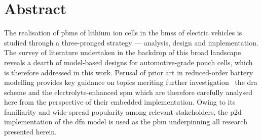 
\chapter*{Abstract\hfill}

\vspace*{-1cm}

The  realisation of  \glspl{pbm}  of lithium  ion cells  in  the \glspl{bms}  of
electric  vehicles is  studied through  a three-pronged  strategy ---  analysis,
design  and  implementation.   The  survey  of  literature   undertaken  in  the
backdrop of  this broad landscape  reveals a  dearth of model-based  designs for
automotive-grade  pouch  cells,  which  is therefore  addressed  in  this  work.
Perusal of  prior art in  reduced-order battery modelling provides  key guidance
on  topics meriting  further  investigation \viz~the  \gls{dra}  scheme and  the
electrolyte-enhanced \gls{spm} which are  therefore carefully analysed here from
the perspective of  their embedded implementation. Owing to  its familiarity and
wide-spread popularity among relevant stakeholders, the \gls{p2d} implementation
of  the \gls{dfn}  model  is used  as the  \gls{pbm}  underpinning all  research
presented herein.




